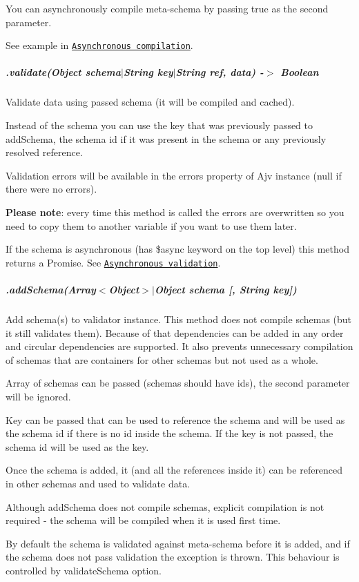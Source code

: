 You can asynchronously compile meta-\/schema by passing {\ttfamily true} as the second parameter.

See example in \href{#asynchronous-schema-compilation}{\tt Asynchronous compilation}.

\subparagraph*{.validate(Object schema$\vert$\+String key$\vert$\+String ref, data) -\/$>$ Boolean}

Validate data using passed schema (it will be compiled and cached).

Instead of the schema you can use the key that was previously passed to {\ttfamily add\+Schema}, the schema id if it was present in the schema or any previously resolved reference.

Validation errors will be available in the {\ttfamily errors} property of Ajv instance ({\ttfamily null} if there were no errors).

{\bfseries Please note}\+: every time this method is called the errors are overwritten so you need to copy them to another variable if you want to use them later.

If the schema is asynchronous (has {\ttfamily \$async} keyword on the top level) this method returns a Promise. See \href{#asynchronous-validation}{\tt Asynchronous validation}.

\subparagraph*{.add\+Schema(Array$<$Object$>$$\vert$\+Object schema \mbox{[}, String key\mbox{]})}

Add schema(s) to validator instance. This method does not compile schemas (but it still validates them). Because of that dependencies can be added in any order and circular dependencies are supported. It also prevents unnecessary compilation of schemas that are containers for other schemas but not used as a whole.

Array of schemas can be passed (schemas should have ids), the second parameter will be ignored.

Key can be passed that can be used to reference the schema and will be used as the schema id if there is no id inside the schema. If the key is not passed, the schema id will be used as the key.

Once the schema is added, it (and all the references inside it) can be referenced in other schemas and used to validate data.

Although {\ttfamily add\+Schema} does not compile schemas, explicit compilation is not required -\/ the schema will be compiled when it is used first time.

By default the schema is validated against meta-\/schema before it is added, and if the schema does not pass validation the exception is thrown. This behaviour is controlled by {\ttfamily validate\+Schema} option.


